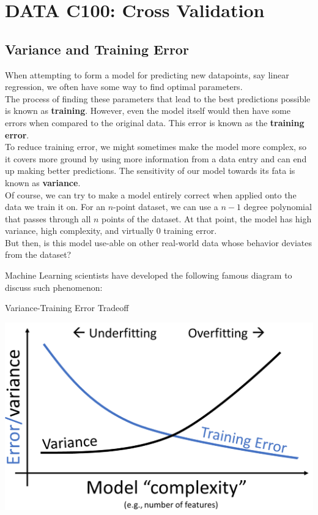 \chapter{DATA C100: Cross Validation}

\section{Variance and Training Error}
When attempting to form a model for predicting new datapoints, say linear regression, we often have some way to find optimal parameters. \\
The process of finding these parameters that lead to the best predictions possible is known as \textbf{training}. However, even the model itself would then have some errors when compared to the original data. This error is known as the \textbf{training error}. \\
To reduce training error, we might sometimes make the model more complex, so it covers more ground by using more information from a data entry and can end up making better predictions. The sensitivity of our model towards its fata is known as \textbf{variance}. \\
Of course, we can try to make a model entirely correct when applied onto the data we train it on. For an $n$-point dataset, we can use a $n-1$ degree polynomial that passes through all $n$ points of the dataset. At that point, the model has high variance, high complexity, and virtually $0$ training error. \\
But then, is this model use-able on other real-world data whose behavior deviates from the dataset?

Machine Learning scientists have developed the following famous diagram to discuss such phenomenon:
\begin{ln-fig}{Variance-Training Error Tradeoff}{}
    \begin{center}
        \includegraphics[scale=0.4]{figs/ln06/var-train-err-tradeoff.png}
    \end{center}
\end{ln-fig}

